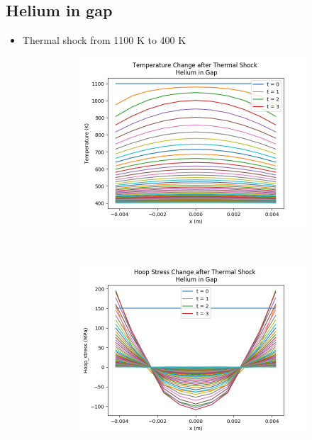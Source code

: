 \documentclass[12pt]{article}
\begin{document}
\subsection{Helium in gap}
\begin{itemize}
\item Thermal shock from 1100 K to 400 K
\begin{figure}[h]
    \centering
    \begin{subfigure}[b]{0.4\textwidth}
        \includegraphics[width=\textwidth]{thermalShock_He_T_vs_x.png}
        \caption{}
        \label{fig:t125}
    \end{subfigure}
    ~ 
    \begin{subfigure}[b]{0.4\textwidth}
        \includegraphics[width=\textwidth]{thermalShock_He_stress_vs_x.png}

\end{subfigure}
\end{figure}
\end{itemize}
\end{document}
